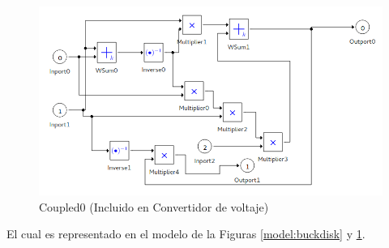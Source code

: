\begin{figure}[H]
\includegraphics[width=0.75\linewidth]{buck_disk_coupled0}
\caption{Coupled0 (Incluido en Convertidor de voltaje)}\label{model:buckdiskcoupled0}
\end{figure}

El cual es representado en el modelo de la Figuras \ref{model:buckdisk} y \ref{model:buckdiskcoupled0}.

